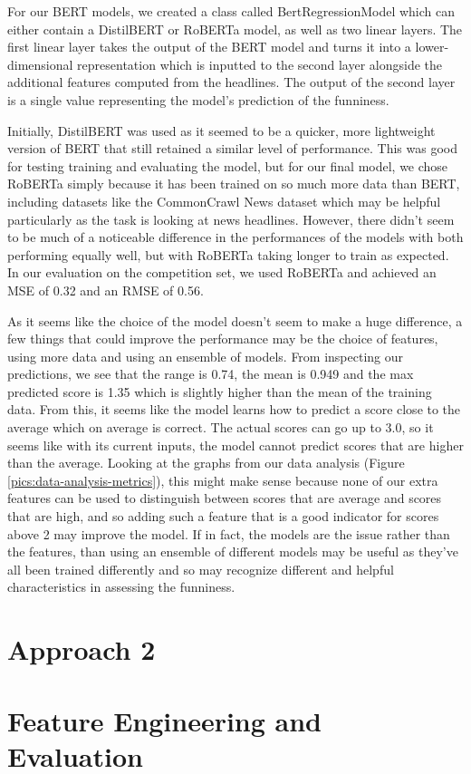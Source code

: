 \documentclass[11pt,a4paper]{article}
\begin{document}
For our BERT models, we created a class called BertRegressionModel which can either contain a DistilBERT or RoBERTa model, as well as two linear layers. The first linear layer takes the output of the BERT model and turns it into a lower-dimensional representation which is inputted to the second layer alongside the additional features computed from the headlines. The output of the second layer is a single value representing the model’s prediction of the funniness.

Initially, DistilBERT was used as it seemed to be a quicker, more lightweight version of BERT that still retained a similar level of performance. This was good for testing training and evaluating the model, but for our final model, we chose RoBERTa simply because it has been trained on so much more data than BERT, including datasets like the CommonCrawl News dataset which may be helpful particularly as the task is looking at news headlines. However, there didn’t seem to be much of a noticeable difference in the performances of the models with both performing equally well, but with RoBERTa taking longer to train as expected. In our evaluation on the competition set, we used RoBERTa and achieved an MSE of 0.32 and an RMSE of 0.56.

As it seems like the choice of the model doesn’t seem to make a huge difference, a few things that could improve the performance may be the choice of features, using more data and using an ensemble of models. From inspecting our predictions, we see that the range is 0.74, the mean is 0.949 and the max predicted score is 1.35 which is slightly higher than the mean of the training data. From this, it seems like the model learns how to predict a score close to the average which on average is correct. The actual scores can go up to 3.0, so it seems like with its current inputs, the model cannot predict scores that are higher than the average. Looking at the graphs from our data analysis (Figure \ref{pics:data-analysis-metrics}), this might make sense because none of our extra features can be used to distinguish between scores that are average and scores that are high, and so adding such a feature that is a good indicator for scores above 2 may improve the model. If in fact, the models are the issue rather than the features, than using an ensemble of different models may be useful as they’ve all been trained differently and so may recognize different and helpful characteristics in assessing the funniness.

\section{Approach 2}
\section{Feature Engineering and Evaluation}
\end{document}
